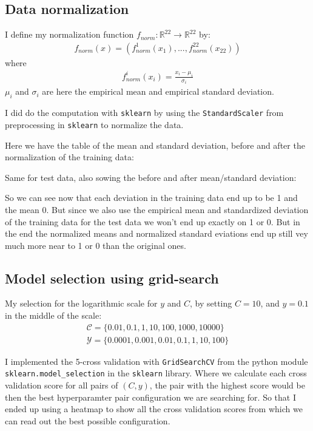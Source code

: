 \subsection{Data normalization}
I define my normalization function $f_{norm}:\mathbb{R}^{22}\to \mathbb{R}^{22}$ by:
\begin{align}
f_{norm}(x) = \left(f^1_{norm}(x_1), ...,f^{22}_{norm}(x_{22})\right) 
\end{align}
where
\begin{align}
f^i_{norm}(x_i) = \frac{x_i - \mu_i}{\sigma_i}
\end{align}
$\mu_i$ and $\sigma_i$ are here the empirical mean and empirical standard deviation.

I did do the computation with \texttt{sklearn} by using the \texttt{StandardScaler} from preprocessing in \texttt{sklearn}
to normalize the data.

Here we have the table of the mean and standard deviation, before and after the normalization of the training data:
\begin{center}

\end{center}

Same for test data, also sowing the before and after mean/standard deviation:
\begin{center}

\end{center}

So we can see now that each deviation in the training data end up to be 1 and the mean 0.
But since we also use the empirical mean and standardized deviation of the training data for the test data we won't end up exactly on 1 or 0.
But in the end the normalized means and normalized standard eviations end up still vey much more near to 1 or 0 than the original ones.

\subsection{Model selection using grid-search}

My selection for the logarithmic scale for $y$ and $C$, by setting $C=10$, and $y=0.1$ in the middle of the scale:
\begin{align}
\mathcal{C}=\{0.01,0.1,1,10,100,1000,10000\}\\ 
\mathcal{Y} = \{0.0001,0.001,0.01,0.1,1,10,100 \}
\end{align}

I implemented the 5-cross validation with \texttt{GridSearchCV} from the python module \texttt{sklearn.model\_selection} in the \texttt{sklearn} library.
Where we calculate each cross validation score for all pairs of $(C,y)$, the pair with the highest score would be then the best hyperparamter pair configuration we are searching for.
So that I ended up using a heatmap to show all the cross validation scores from which we can read out the best possible configuration.

